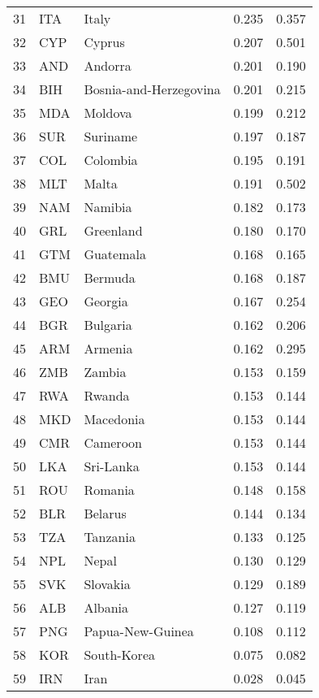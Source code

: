 \begin{table}
\begin{tabular}[t]{rllrr}
\midrule
31 & ITA & Italy & 0.235 & 0.357\\
32 & CYP & Cyprus & 0.207 & 0.501\\
33 & AND & Andorra & 0.201 & 0.190\\
34 & BIH & Bosnia-and-Herzegovina & 0.201 & 0.215\\
35 & MDA & Moldova & 0.199 & 0.212\\
\midrule
36 & SUR & Suriname & 0.197 & 0.187\\
37 & COL & Colombia & 0.195 & 0.191\\
38 & MLT & Malta & 0.191 & 0.502\\
39 & NAM & Namibia & 0.182 & 0.173\\
40 & GRL & Greenland & 0.180 & 0.170\\
\midrule
41 & GTM & Guatemala & 0.168 & 0.165\\
42 & BMU & Bermuda & 0.168 & 0.187\\
43 & GEO & Georgia & 0.167 & 0.254\\
44 & BGR & Bulgaria & 0.162 & 0.206\\
45 & ARM & Armenia & 0.162 & 0.295\\
\midrule
46 & ZMB & Zambia & 0.153 & 0.159\\
47 & RWA & Rwanda & 0.153 & 0.144\\
48 & MKD & Macedonia & 0.153 & 0.144\\
49 & CMR & Cameroon & 0.153 & 0.144\\
50 & LKA & Sri-Lanka & 0.153 & 0.144\\
\midrule
51 & ROU & Romania & 0.148 & 0.158\\
52 & BLR & Belarus & 0.144 & 0.134\\
53 & TZA & Tanzania & 0.133 & 0.125\\
54 & NPL & Nepal & 0.130 & 0.129\\
55 & SVK & Slovakia & 0.129 & 0.189\\
\midrule
56 & ALB & Albania & 0.127 & 0.119\\
57 & PNG & Papua-New-Guinea & 0.108 & 0.112\\
58 & KOR & South-Korea & 0.075 & 0.082\\
59 & IRN & Iran & 0.028 & 0.045\\
\bottomrule
\end{tabular}
\end{table}